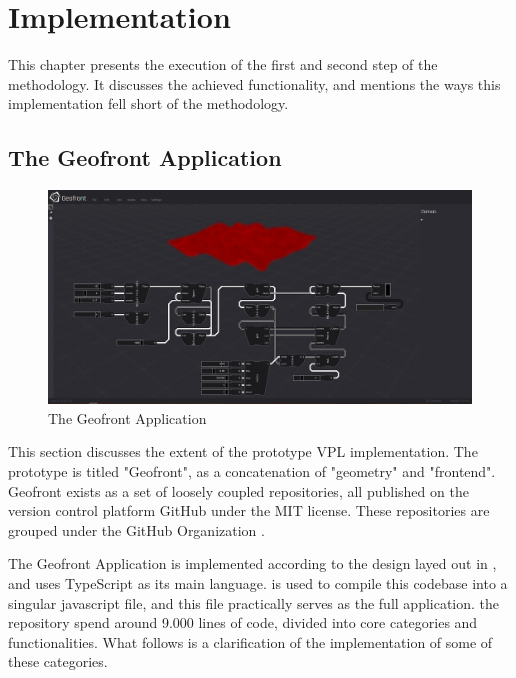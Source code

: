 \chapter{Implementation}%
\label{chap:implementation}
This chapter presents the execution of the first and second step of the methodology. 
It discusses the achieved functionality, and mentions the ways this implementation fell short of the methodology.

\section{The Geofront Application}
\label{sec:implementation:app}

\begin{figure}
  \centering
  \graphicspath{ {../../assets/images/implementation/} }
  \includegraphics[width=\linewidth]{full-application.png}
  \caption[Geofront]{The Geofront Application}
  \label{fig:geofront-app}
\end{figure}

This section discusses the extent of the prototype \ac{VPL} implementation. 
The prototype is titled "Geofront", as a concatenation of "geometry" and "frontend".
Geofront exists as a set of loosely coupled repositories, all published on the version control platform GitHub under the MIT license. These repositories are grouped under the GitHub Organization  .


The Geofront Application is implemented according to the design layed out in , and uses TypeScript as its main language. 
 is used to compile this codebase into a singular javascript file, and this file practically serves as the full application. 
the repository spend around 9.000 lines of code, divided into core categories and functionalities.
What follows is a clarification of the implementation of some of these categories.

